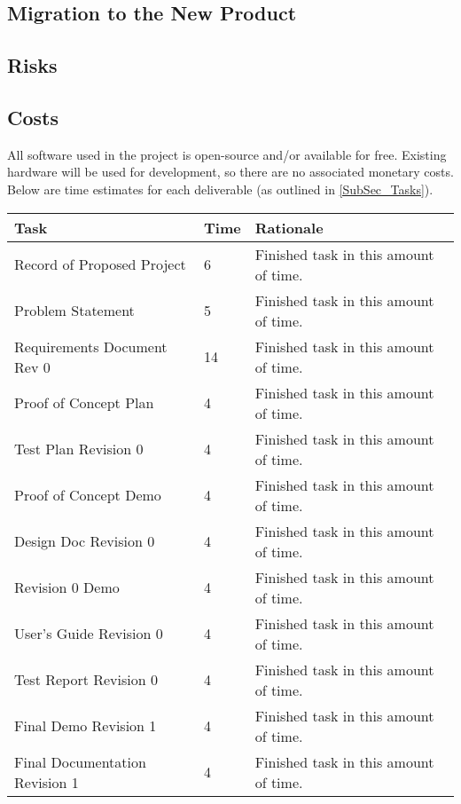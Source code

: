 \documentclass[12pt]{article}
\begin{document}
\subsection{Migration to the New Product} %

\subsection{Risks} %

\subsection{Costs} %
All software used in the project is open-source and/or available for free. Existing hardware will be used for development, so there are no associated monetary costs.\\

Below are time estimates for each deliverable (as outlined in \ref{SubSec_Tasks}).
\begin{table}[h]
\centering
\begin{tabular}{|p{}|p{}|p{}|}
\hline
Task & Time & Rationale\\
\hline\hline
Record of Proposed Project & 6 & Finished task in this amount of time.\\ 
Problem Statement & 5 & Finished task in this amount of time.\\ 
Requirements Document Rev 0 & 14 & Finished task in this amount of time.\\ 
Proof of Concept Plan & 4 & Finished task in this amount of time.\\ 
Test Plan Revision 0 & 4 & Finished task in this amount of time.\\ 
Proof of Concept Demo & 4 & Finished task in this amount of time.\\ 
Design Doc Revision 0 & 4 & Finished task in this amount of time.\\ 
Revision 0 Demo & 4 & Finished task in this amount of time.\\ 
User's Guide Revision 0 & 4 & Finished task in this amount of time.\\ 
Test Report Revision 0 & 4 & Finished task in this amount of time.\\ 
Final Demo Revision 1 & 4 & Finished task in this amount of time.\\ 
Final Documentation Revision 1 & 4 & Finished task in this amount of time.\\ 
\hline
\end{tabular}
\end{table}
\end{document}
